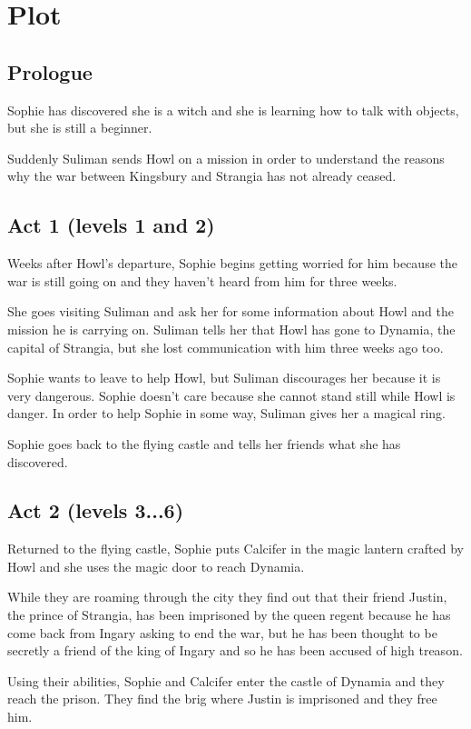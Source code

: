 \section{Plot}

\subsection*{Prologue}
Sophie has discovered she is a witch and she is learning how to talk with objects, but she is still a beginner.

Suddenly Suliman sends Howl on a mission in order to understand the reasons why the war between Kingsbury and Strangia has not already ceased.

\subsection*{Act 1 (levels 1 and 2)}
Weeks after Howl's departure, Sophie begins getting worried for him because the war is still going on and they haven't heard from him for three weeks.

She goes visiting Suliman and ask her for some information about Howl and the mission he is carrying on. Suliman tells her that Howl has gone to Dynamia, the capital of Strangia, but she lost communication with him three weeks ago too.

Sophie wants to leave to help Howl, but Suliman discourages her because it is very dangerous. Sophie doesn't care because she cannot stand still while Howl is danger. In order to help Sophie in some way, Suliman gives her a magical ring.

Sophie goes back to the flying castle and tells her friends what she has discovered.

\subsection*{Act 2 (levels 3...6)}
Returned to the flying castle, Sophie puts Calcifer in the magic lantern crafted by Howl and she uses the magic door to reach Dynamia.

While they are roaming through the city they find out that their friend Justin, the prince of Strangia, has been imprisoned by the queen regent because he has come back from Ingary asking to end the war, but he has been thought to be secretly a friend of the king of Ingary and so he has been accused of high treason. 

Using their abilities, Sophie and Calcifer enter the castle of Dynamia and they reach the prison. They find the brig where Justin is imprisoned and they free him.

